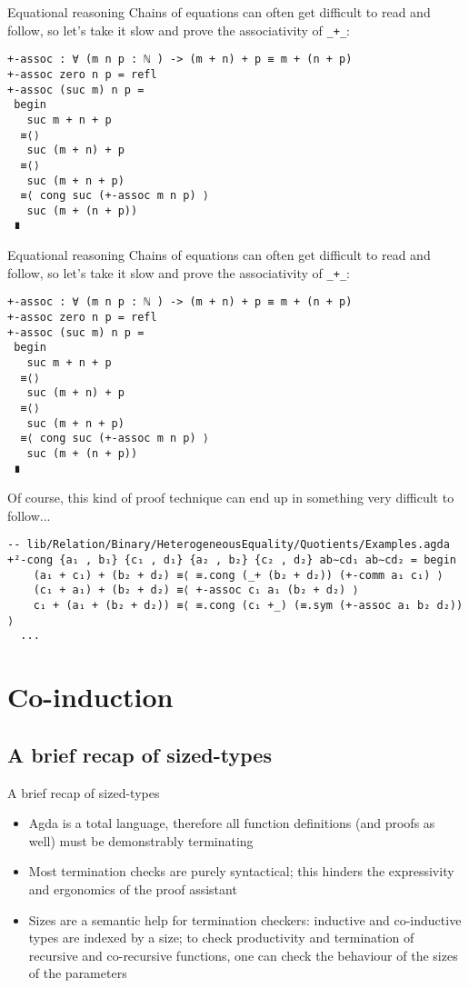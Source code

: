 \documentclass[t,aspectratio=169,9pt]{beamer}
\begin{document}
\begin{frame}{Equational reasoning}
  Chains of equations can often get difficult to read and follow, so let's take
  it slow and prove the associativity of \texttt{_+_}:
\begin{verbatim}
+-assoc : ∀ (m n p : ℕ ) -> (m + n) + p ≡ m + (n + p)
+-assoc zero n p = refl
+-assoc (suc m) n p =
 begin
   suc m + n + p
  ≡⟨⟩
   suc (m + n) + p
  ≡⟨⟩
   suc (m + n + p)
  ≡⟨ cong suc (+-assoc m n p) ⟩
   suc (m + (n + p))
 ∎
\end{verbatim}
\end{frame}

\begin{frame}{Equational reasoning}
  Chains of equations can often get difficult to read and follow, so let's take
  it slow and prove the associativity of \texttt{_+_}:
\begin{verbatim}
+-assoc : ∀ (m n p : ℕ ) -> (m + n) + p ≡ m + (n + p)
+-assoc zero n p = refl
+-assoc (suc m) n p =
 begin
   suc m + n + p
  ≡⟨⟩
   suc (m + n) + p
  ≡⟨⟩
   suc (m + n + p)
  ≡⟨ cong suc (+-assoc m n p) ⟩
   suc (m + (n + p))
 ∎
\end{verbatim}

Of course, this kind of proof technique can end up in something very difficult
to follow...
\begin{verbatim}
-- lib/Relation/Binary/HeterogeneousEquality/Quotients/Examples.agda
+²-cong {a₁ , b₁} {c₁ , d₁} {a₂ , b₂} {c₂ , d₂} ab∼cd₁ ab∼cd₂ = begin
    (a₁ + c₁) + (b₂ + d₂) ≡⟨ ≡.cong (_+ (b₂ + d₂)) (+-comm a₁ c₁) ⟩
    (c₁ + a₁) + (b₂ + d₂) ≡⟨ +-assoc c₁ a₁ (b₂ + d₂) ⟩
    c₁ + (a₁ + (b₂ + d₂)) ≡⟨ ≡.cong (c₁ +_) (≡.sym (+-assoc a₁ b₂ d₂)) ⟩
  ...
\end{verbatim}
\end{frame}

\section[coinduction]{Co-induction}
\subsection[coinduction]{A brief recap of sized-types}
\begin{frame}[fragile]{A brief recap of sized-types}
  \vfill
  \begin{itemize}
    \item {
	Agda is a total language, therefore all function definitions (and proofs
	as well) must be demonstrably terminating
    }
    \item {
	Most termination checks are purely syntactical; this hinders the
	expressivity and ergonomics of the proof assistant
      }
    \item {
	Sizes are a semantic help for termination checkers: inductive and
	co-inductive types are indexed by a size; to check productivity 
	and termination of recursive and co-recursive functions, one can check
	the behaviour of the sizes of the parameters 
      }
  \end{itemize}
  \vfill
\end{frame}
\end{document}
